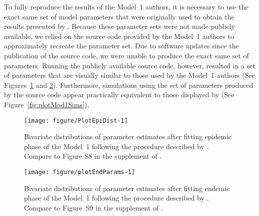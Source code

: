 To fully reproduce the results of the Model~1 authors, it is necessary to use the exact same set of model parameters that were originally used to obtain the results presented by \citet{lee20}.
Because these parameter sets were not made publicly available, we relied on the source code provided by the Model~1 authors to approximately recreate the parameter set.
Due to software updates since the publication of the source code, we were unable to produce the exact same set of parameters.
Running the publicly available source code, however, resulted in a set of parameters that are visually similar to those used by the Model~1 authors (See Figures~\ref{fig:PlotEpiDist} and \ref{fig:plotEndParams}).
Furthermore, simulations using the set of parameters produced by the source code appear practically equivalent to those displayed by \citet{lee20} (See Figure~\ref{fig:plotMod1Sims}).



\begin{figure}[!h]
\begin{knitrout}
\color{fgcolor}

{\centering \texttt{[image: figure/PlotEpiDist-1]} 

}


\end{knitrout}
\caption[Replicating Model 1 epidemic phase parameter distributions]{\label{fig:PlotEpiDist}
Bivariate distributions of parameter estimates after fitting epidemic phase of the Model~1 following the procedure described by \citet{lee20}. Compare to Figure S8 in the supplement of \citet{lee20}.
}
\end{figure}





\begin{figure}[!h]
\begin{knitrout}
\color{fgcolor}

{\centering \texttt{[image: figure/plotEndParams-1]} 

}


\end{knitrout}
\caption[Replicating Model 1 endemic phase parameter distributions]{\label{fig:plotEndParams}
Bivariate distributions of parameter estimates after fitting endemic phase of the Model~1 following the procedure described by \citet{lee20}. Compare to Figure~S9 in the supplement of \citet{lee20}.
}
\end{figure}



